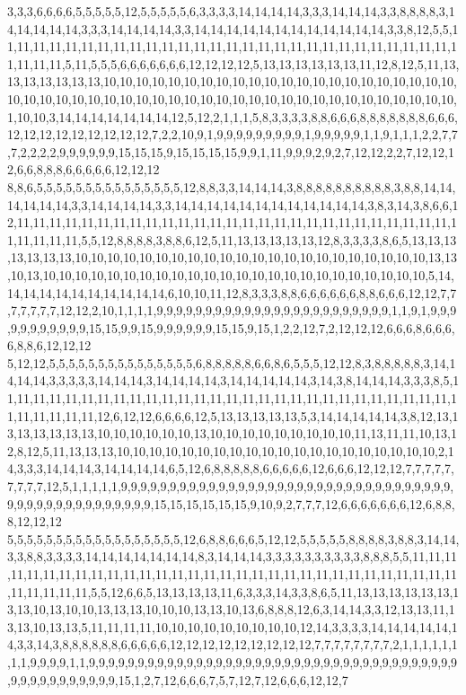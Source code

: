 3,3,3,6,6,6,6,5,5,5,5,5,12,5,5,5,5,5,6,3,3,3,3,14,14,14,14,3,3,3,14,14,14,3,3,8,8,8,8,3,14,14,14,14,14,3,3,3,14,14,14,14,3,3,14,14,14,14,14,14,14,14,14,14,14,14,3,3,8,12,5,5,11,11,11,11,11,11,11,11,11,11,11,11,11,11,11,11,11,11,11,11,11,11,11,11,11,11,11,11,11,11,11,11,5,11,5,5,5,6,6,6,6,6,6,6,12,12,12,12,5,13,13,13,13,13,13,11,12,8,12,5,11,13,13,13,13,13,13,13,10,10,10,10,10,10,10,10,10,10,10,10,10,10,10,10,10,10,10,10,10,10,10,10,10,10,10,10,10,10,10,10,10,10,10,10,10,10,10,10,10,10,10,10,10,10,10,10,10,10,1,10,10,3,14,14,14,14,14,14,14,12,5,12,2,1,1,1,5,8,3,3,3,3,8,8,6,6,6,8,8,8,8,8,8,8,6,6,6,12,12,12,12,12,12,12,12,12,7,2,2,10,9,1,9,9,9,9,9,9,9,9,9,1,9,9,9,9,9,1,1,9,1,1,1,2,2,7,7,7,2,2,2,2,9,9,9,9,9,9,15,15,15,9,15,15,15,15,9,9,1,11,9,9,9,2,9,2,7,12,12,2,2,7,12,12,12,6,6,8,8,8,6,6,6,6,6,12,12,12
8,8,6,5,5,5,5,5,5,5,5,5,5,5,5,5,5,5,12,8,8,3,3,14,14,14,3,8,8,8,8,8,8,8,8,8,8,3,8,8,14,14,14,14,14,14,3,3,14,14,14,14,3,3,14,14,14,14,14,14,14,14,14,14,14,14,3,8,3,14,3,8,6,6,12,11,11,11,11,11,11,11,11,11,11,11,11,11,11,11,11,11,11,11,11,11,11,11,11,11,11,11,11,11,11,11,11,5,5,12,8,8,8,8,3,8,8,6,12,5,11,13,13,13,13,13,12,8,3,3,3,3,8,6,5,13,13,13,13,13,13,13,10,10,10,10,10,10,10,10,10,10,10,10,10,10,10,10,10,10,10,10,10,10,13,13,10,13,10,10,10,10,10,10,10,10,10,10,10,10,10,10,10,10,10,10,10,10,10,10,10,10,5,14,14,14,14,14,14,14,14,14,14,14,6,10,10,11,12,8,3,3,3,8,8,6,6,6,6,6,6,8,8,6,6,6,12,12,7,7,7,7,7,7,7,12,12,2,10,1,1,1,1,9,9,9,9,9,9,9,9,9,9,9,9,9,9,9,9,9,9,9,9,9,9,9,9,1,1,9,1,9,9,9,9,9,9,9,9,9,9,9,15,15,9,9,15,9,9,9,9,9,9,15,15,9,15,1,2,2,12,7,2,12,12,12,6,6,6,8,6,6,6,6,8,8,6,12,12,12
5,12,12,5,5,5,5,5,5,5,5,5,5,5,5,5,5,5,6,8,8,8,8,8,6,6,8,6,5,5,5,12,12,8,3,8,8,8,8,8,3,14,14,14,14,3,3,3,3,3,14,14,14,3,14,14,14,14,3,14,14,14,14,14,3,14,3,8,14,14,14,3,3,3,8,5,11,11,11,11,11,11,11,11,11,11,11,11,11,11,11,11,11,11,11,11,11,11,11,11,11,11,11,11,11,11,11,11,11,11,12,6,12,12,6,6,6,6,12,5,13,13,13,13,13,5,3,14,14,14,14,14,3,8,12,13,13,13,13,13,13,13,10,10,10,10,10,10,13,10,10,10,10,10,10,10,10,10,11,13,11,11,10,13,12,8,12,5,11,13,13,13,10,10,10,10,10,10,10,10,10,10,10,10,10,10,10,10,10,10,10,10,2,14,3,3,3,14,14,14,3,14,14,14,14,6,5,12,6,8,8,8,8,8,6,6,6,6,6,12,6,6,6,12,12,12,7,7,7,7,7,7,7,7,7,12,5,1,1,1,1,1,9,9,9,9,9,9,9,9,9,9,9,9,9,9,9,9,9,9,9,9,9,9,9,9,9,9,9,9,9,9,9,9,9,9,9,9,9,9,9,9,9,9,9,9,9,9,9,9,9,15,15,15,15,15,15,9,10,9,2,7,7,7,12,6,6,6,6,6,6,6,12,6,8,8,8,12,12,12
5,5,5,5,5,5,5,5,5,5,5,5,5,5,5,5,5,5,12,6,8,8,6,6,6,5,12,12,5,5,5,5,5,8,8,8,8,3,8,8,3,14,14,3,3,8,8,3,3,3,3,14,14,14,14,14,14,14,8,3,14,14,14,3,3,3,3,3,3,3,3,3,3,8,8,8,5,5,11,11,11,11,11,11,11,11,11,11,11,11,11,11,11,11,11,11,11,11,11,11,11,11,11,11,11,11,11,11,11,11,11,11,11,11,5,5,12,6,6,5,13,13,13,13,11,6,3,3,3,14,3,3,8,6,5,11,13,13,13,13,13,13,13,13,10,13,10,10,13,13,13,10,10,10,13,13,10,13,6,8,8,8,12,6,3,14,14,3,3,12,13,13,11,13,13,10,13,13,5,11,11,11,11,10,10,10,10,10,10,10,10,10,12,14,3,3,3,3,14,14,14,14,14,14,3,3,14,3,8,8,8,8,8,8,6,6,6,6,6,12,12,12,12,12,12,12,12,12,7,7,7,7,7,7,7,7,2,1,1,1,1,1,1,1,1,9,9,9,9,1,1,9,9,9,9,9,9,9,9,9,9,9,9,9,9,9,9,9,9,9,9,9,9,9,9,9,9,9,9,9,9,9,9,9,9,9,9,9,9,9,9,9,9,9,9,9,9,9,9,9,15,1,2,7,12,6,6,6,7,5,7,12,7,12,6,6,6,12,12,7
